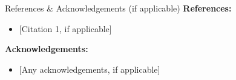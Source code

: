 \documentclass[
  ignorenonframetext,
  aspectratio=169,
]{beamer}
\providecommand{\tightlist}{%
  \setlength{\itemsep}{0pt}\setlength{\parskip}{0pt}}
\begin{document}
\begin{frame}{References \& Acknowledgements (if applicable)}
\protect{}\label{references-acknowledgements-if-applicable}
\textbf{References:}

\begin{itemize}
\tightlist
\item
  {[}Citation 1, if applicable{]}
\end{itemize}

\textbf{Acknowledgements:}

\begin{itemize}
\tightlist
\item
  {[}Any acknowledgements, if applicable{]}
\end{itemize}
\end{frame}
\end{document}
